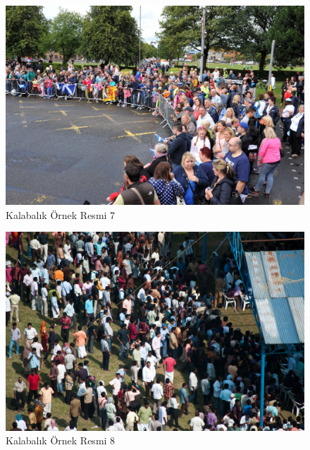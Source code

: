 \documentclass[10pt,a4paper]{report}
\begin{document}
	\begin{figure}[!h]
		
		\raggedright
		\includegraphics[width=\textwidth]{QNRF1}
		\caption{Kalabalık Örnek Resmi 7 \cite{2018composition2}}
		\label{Ornek_sonuc1}
	\end{figure}
	
	\begin{figure}[!h]
		
		\raggedright
		\includegraphics[width=\textwidth]{QNRF2}
		\caption{Kalabalık Örnek Resmi 8 \cite{2018composition2}}
		\label{Ornek_sonuc2}
	\end{figure}
	
\end{document}
